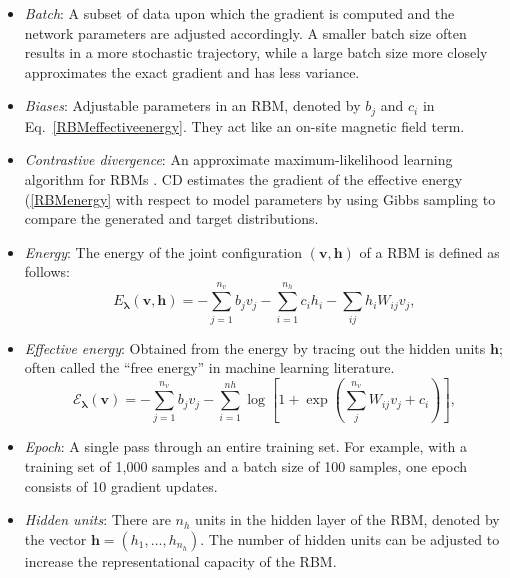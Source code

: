 \documentclass[submission, Phys, hidelnks]{SciPost}
\begin{document}
\begin{itemize}

\item {\it Batch}: A subset of data upon which the gradient is computed and the network parameters are adjusted accordingly. A smaller batch size often results in a more stochastic trajectory, while a large batch size more closely approximates the exact gradient and has less variance.

\item {\it Biases}: Adjustable parameters in an RBM, denoted by $b_j$ and $c_i$ in Eq.~\eqref{RBMeffectiveenergy}. They act like an on-site magnetic field term.

\item {\it Contrastive divergence}: An approximate maximum-likelihood learning algorithm for RBMs \cite{hinton2002training}. CD estimates the gradient of the effective energy (\ref{RBMenergy} with respect to model parameters by using Gibbs sampling to compare the generated and target distributions.

\item {\it Energy}: The energy of the joint configuration $(\bm{v}, \bm{h})$ of a RBM is defined as follows:
\begin{equation}
   E_{\bm{\lambda}}(\bm{v},\bm{h}) = - \sum\limits_{j=1}^{n_v} b_j v_j - \sum\limits_{i=1}^{n_h} c_i h_i - \sum\limits_{ij} h_i W_{ij} v_j, \label{RBMenergy}
\end{equation}

\item {\it Effective energy}: Obtained from the energy by tracing out the hidden units $\bm{h}$; often called the ``free energy'' in machine learning literature.
\begin{equation}
   \mathcal{E}_{\bm{\lambda}}(\bm{v}) = - \sum\limits_{j=1}^{n_v} b_j v_j - \sum\limits_{i=1}^{nh} \log \left[ 1 + \exp \left( \sum\limits_{j}^{n_v} W_{ij}v_j +c_i\right) \right], \label{RBMeffectiveenergy}
\end{equation}

\item {\it Epoch}: A single pass through an entire training set. For example, with a training set of 1,000 samples and a batch size of 100 samples, one epoch consists of 10 gradient updates.

\item {\it Hidden units}: There are $n_h$ units in the hidden layer of the RBM, denoted by the vector $\bm{h}=(h_1, ..., h_{n_h})$. The number of hidden units can be adjusted to increase the representational capacity of the RBM.


\end{itemize}
\end{document}
